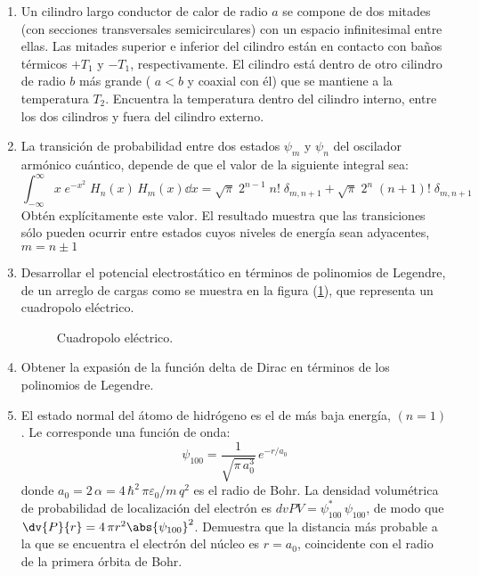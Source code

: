 \begin{enumerate}
\item Un cilindro largo conductor de calor de radio $a$ se compone de dos mitades (con secciones transversales semicirculares) con un espacio infinitesimal entre ellas. Las mitades superior e inferior del cilindro están en contacto con baños térmicos $+T_{1}$ y $-T_{1}$, respectivamente. El cilindro está dentro de otro cilindro de radio  $b$ más grande ( $a < b$ y coaxial con él) que se mantiene a la temperatura $T_{2}$. Encuentra la temperatura dentro del cilindro interno, entre los dos cilindros y fuera del cilindro externo.
\item La transición de probabilidad entre dos estados $\psi_{m}$ y $\psi_{n}$ del oscilador armónico cuántico, depende de que el valor de la siguiente integral sea:
\[ \int_{-\infty}^{\infty} x \; e^{-x^{2}} \; H_{n} (x) \, H_{m}(x) \dd x = \sqrt{\pi} \; 2^{n-1} \; n! \; \delta_{m,n+1} + \sqrt{\pi} \; 2^{n} \; (n+1)! \; \delta_{m,n+1} \]
Obtén explícitamente este valor. El resultado muestra que las transiciones sólo pueden ocurrir entre estados cuyos niveles de energía sean adyacentes, $m = n \pm 1$
\item Desarrollar el potencial electrostático en términos de polinomios de Legendre, de un arreglo de cargas como se muestra en la figura (\ref{fig:figura1}), que representa un cuadropolo eléctrico.
\begin{figure}[H]
\centering

\caption{Cuadropolo eléctrico.}
\label{fig:figura1}
\end{figure}
\item Obtener la expasión de la función delta de Dirac en términos de los polinomios de Legendre.
\item El estado normal del átomo de hidrógeno es el de más baja energía, $(n = 1)$. Le corresponde una función de onda:
\[ \psi_{100} = \dfrac{1}{\sqrt{\pi \, a_{0}^{3}}} \, e^{-r/a_{0}}\]
donde $a_{0} = 2 \, \alpha = 4 \, \hbar^{2} \, \pi \varepsilon_{0}/ m \,q^{2}$ es el radio de Bohr. La densidad volumétrica de probabilidad de localización del electrón es $dv{P}{V} = \psi_{100}^{*} \, \psi_{100}$, de modo que $\dv{P}{r} = 4 \, \pi r^{2} \abs{\psi_{100}}^{2}$. Demuestra que la distancia más probable a la que se encuentra el electrón del núcleo es $r = a_{0}$, coincidente con el radio de la primera órbita de Bohr.

\end{enumerate}
